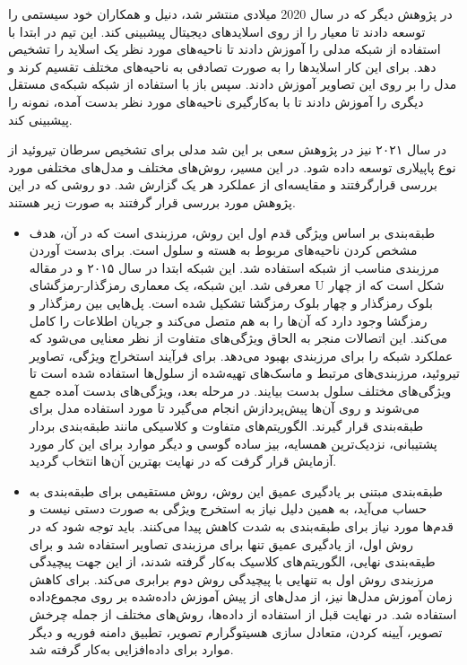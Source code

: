 در پژوهش دیگر \cite{elliott2020application} که در سال 2020 میلادی منتشر شد، دنیل و همکاران خود سیستمی را توسعه دادند تا معیار  را از روی اسلاید‌های دیجیتال پیشبینی کند. این تیم در ابتدا با استفاده از شبکه  مدلی را آموزش دادند تا ناحیه‌های مورد نظر یک اسلاید را تشخیص دهد. برای این کار اسلایدها را به صورت تصادفی به ناحیه‌های مختلف تقسیم کرند و مدل را بر روی این تصاویر آموزش دادند.
سپس باز با استفاده از شبکه  شبکه‌ی مستقل دیگری را آموزش دادند تا با به‌کارگیری ناحیه‌های مورد نظر بدست آمده،  نمونه را پیشبینی کند.



در سال ۲۰۲۱ نیز در پژوهش \cite{bohland2021machine} سعی بر این شد مدلی برای تشخیص سرطان تیروئید از نوع پاپیلاری توسعه داده شود.
در این مسیر، روش‌های مختلف و مدل‌های مختلفی مورد بررسی قرارگرفتند و مقایسه‌ای از عملکرد هر یک گزارش شد.
دو روشی که در این پژوهش مورد بررسی قرار گرفتند به صورت زیر هستند.
\begin{itemize}
    \item طبقه‌بندی بر اساس ویژگی\newline
    قدم اول این روش، مرزبندی است که در آن، هدف مشخص کردن ناحیه‌های مربوط به هسته و سلول است.
    برای بدست آوردن مرزبندی مناسب از شبکه  استفاده شد. این شبکه ابتدا در سال ۲۰۱۵ و در مقاله \cite{ronneberger2015u} معرفی شد.
    این شبکه، یک معماری رمزگذار-رمزگشای U شکل است که از چهار بلوک رمزگذار و چهار بلوک رمزگشا تشکیل شده است.
    پل‌هایی بین رمزگذار و رمزگشا وجود دارد که آن‌ها را به هم متصل می‌کند و جریان اطلاعات را کامل می‌کند.
    این اتصالات منجر به الحاق ویژگی‌های متفاوت از نظر معنایی می‌شود که عملکرد شبکه را برای مرزبندی بهبود می‌دهد.
    برای فرآیند استخراج ویژگی، تصاویر تیروئید، مرزبندی‌های مرتبط و ماسک‌های تهیه‌شده از سلول‌ها استفاده شده است تا ویژگی‌های مختلف سلول بدست بیایند.
    در مرحله بعد، ویژگی‌های بدست آمده جمع می‌شوند و روی آن‌ها پیش‌پردازش انجام می‌گیرد تا مورد استفاده مدل برای طبقه‌بندی قرار گیرند. الگوریتم‌های متفاوت و کلاسیکی مانند طبقه‌بندی بردار پشتیبانی، نزدیک‌ترین همسایه، بیز ساده گوسی و دیگر موارد برای این کار مورد آزمایش قرار گرفت که در نهایت بهترین آن‌ها انتخاب گردید.

    \item طبقه‌بندی مبتنی بر یادگیری عمیق\newline
    این روش، روش مستقیمی برای طبقه‌بندی به حساب می‌آید، به همین دلیل نیاز به استخرج ویژگی به صورت دستی نیست و قدم‌ها مورد نیاز برای طبقه‌بندی به شدت کاهش پیدا می‌کنند.
    باید توجه شود که در روش اول، از یادگیری عمیق تنها برای مرزبندی تصاویر استفاده شد و برای طیقه‌بندی نهایی، الگوریتم‌های کلاسیک به‌کار گرفته شدند، از این جهت پیچیدگی مرزبندی روش اول به تنهایی با پیچیدگی روش دوم برابری می‌کند.
    برای کاهش زمان آموزش مدل‌ها نیز، از مدل‌های از پیش آموزش داده‌شده بر روی مجموع‌داده \cite{deng2009imagenet} استفاده شد. در نهایت قبل از استفاده از داده‌ها، روش‌های مختلف از جمله چرخش تصویر، آیینه کردن، متعادل سازی هسیتوگرارم تصویر، تطبیق دامنه فوریه و دیگر موارد برای داده‌افزایی به‌کار گرفته شد.
     

\end{itemize}
